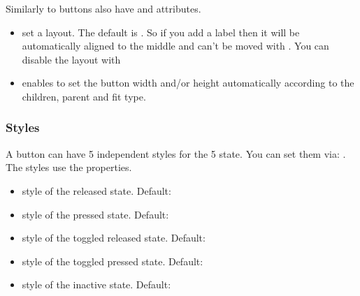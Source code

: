 \documentclass[letterpaper,10pt,english]{sphinxmanual}
\begin{document}
Similarly to {\hyperref[\detokenize{object-types/cont::doc}]{}} buttons also have  and  attributes.
\begin{itemize}
\item {} 
set a layout. The default is .
So if you add a label then it will be automatically aligned to the middle and can’t be moved with .
You can disable the layout with 

\item {} 
 enables to set the button width and/or height automatically according to the children, parent and fit type.

\end{itemize}


\subsubsection{Styles}
\label{\detokenize{object-types/btn:styles}}
A button can have 5 independent styles for the 5 state. You can set them via: . The styles use the  properties.
\begin{itemize}
\item {} 
 style of the released state. Default: 

\item {} 
 style of the pressed state. Default: 

\item {} 
 style of the toggled released state. Default: 

\item {} 
 style of the toggled pressed state. Default: 

\item {} 
 style of the inactive state. Default: 

\end{itemize}
\end{document}
